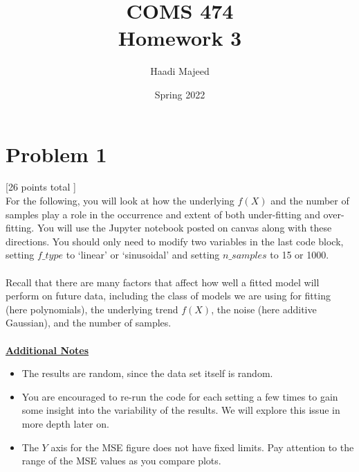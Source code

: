 \documentclass[12pt]{article}
\title{ COMS 474\\Homework 3 }
\author{ Haadi Majeed }
\date{Spring 2022}
\begin{document}
\maketitle
\pagebreak

\section*{Problem 1}
 [26 points total ]\\
For the following, you will look at how the underlying $f(X)$ and the number of samples play a role in the occurrence and extent of both under-fitting and over-fitting. You will use the Jupyter notebook posted on canvas along with these directions. You should only need to modify two variables in the last code block, setting $f\_type$ to ‘linear’ or ‘sinusoidal’ and setting $n\_samples$ to 15 or 1000.
\\\\
Recall that there are many factors that affect how well a fitted model will perform on future data, including the class of models we are using for fitting (here polynomials), the underlying trend $f(X)$, the noise (here additive Gaussian), and the number of samples.
\\\\
\textbf{\underline{Additional Notes}}
\begin{itemize}
    \item The results are random, since the data set itself is random.
    \item You are encouraged to re-run the code for each setting a few times to gain some insight into the variability of the results. We will explore this issue in more depth later on.
    \item The $Y$ axis for the MSE figure does not have fixed limits. Pay attention to the range of the MSE values as you compare plots.
\end{itemize}
\end{document}
